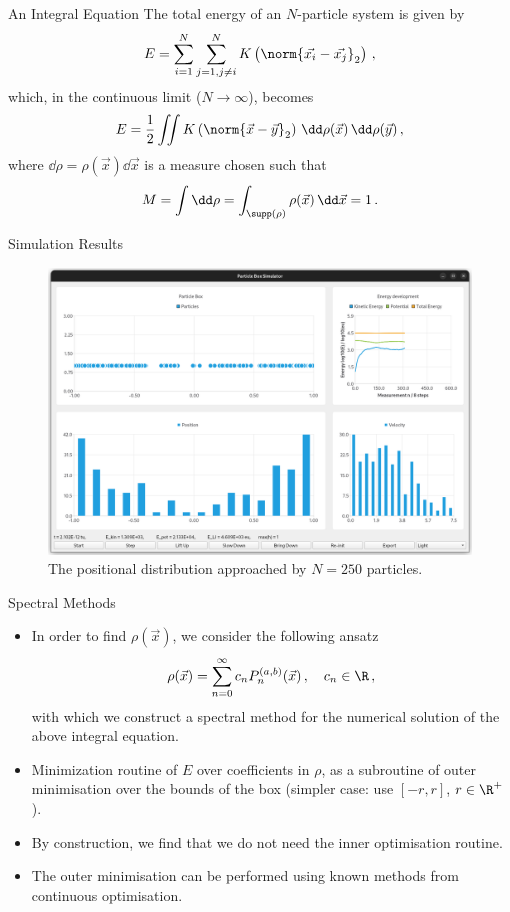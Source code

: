 \documentclass[aspectratio=169, hyperref={colorlinks=true}]{beamer}
\begin{document}
  \begin{frame}{An Integral Equation}
    \vspace{0.4cm}
    The total energy of an $N$-particle system is given by
    $$E = \sum_{i=1}^{N} \sum_{j=1, j \neq i}^{N} K\left(\norm{\vec{x_i} - \vec{x_j}}_2\right)\,,$$
    which, in the continuous limit ($N \rightarrow \infty$), becomes
    $$E = \frac{1}{2} \iint K\left(\norm{\vec{x} - \vec{y}}_2\right) \,\dd\rho(\vec{x})\,\dd\rho(\vec{y})\,,$$
    where $\dd\rho = \rho(\vec{x})\dd\vec{x}$ is a measure chosen such that
    $$M = \int \dd\rho = \int_{\supp(\rho)} \rho(\vec{x}) \,\dd\vec{x} = 1\,.$$
  \end{frame}

  \begin{frame}{Simulation Results}
    \begin{figure}
      \centering
      \includegraphics[width=0.64\linewidth]{figures/screenshot5.png}
      \caption*{The positional distribution approached by $N = 250$ particles.}
    \end{figure}
  \end{frame}

  \begin{frame}{Spectral Methods}
    \begin{itemize}
      \item In order to find $\rho(\vec{x})$, we consider the following ansatz
            $$\rho(\vec{x}) = \sum_{n=0}^{\infty} c_n P_n^{(a,b)}(\vec{x})\,,\quad c_n \in \R\,,$$
            with which we construct a spectral method for the numerical solution of the above integral equation.
      \item Minimization routine of $E$ over coefficients in $\rho$, as a subroutine of outer minimisation over the bounds of the box (simpler case: use $[-r, r]$, $r \in \R^+$).
      \item By construction, we find that we do not need the inner optimisation routine.
      \item The outer minimisation can be performed using known methods from continuous optimisation.
    \end{itemize}
  \end{frame}
\end{document}

